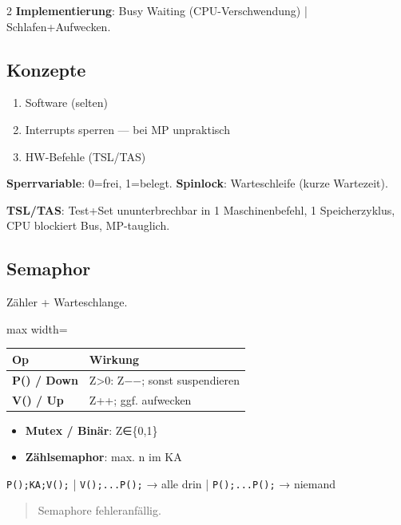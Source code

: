 \documentclass[10pt, a4paper]{article}
\begin{document}
\begin{multicols}{2}
\textbf{Implementierung}: Busy Waiting (CPU-Verschwendung) | Schlafen+Aufwecken.



\subsection{Konzepte}
\begin{enumerate}
  \item Software (selten)
  \item Interrupts sperren — bei MP unpraktisch
  \item HW-Befehle (TSL/TAS)
\end{enumerate}

\textbf{Sperrvariable}: 0=frei, 1=belegt. \textbf{Spinlock}: Warteschleife (kurze Wartezeit).


\textbf{TSL/TAS}: Test+Set ununterbrechbar in 1 Maschinenbefehl, 1 Speicherzyklus, CPU blockiert Bus, MP-tauglich.



\subsection{Semaphor}

Zähler + Warteschlange.



{\small
\begin{adjustbox}{max width=\linewidth}
{\scriptsize
\begin{tabular}{ll}
\toprule
\textbf{Op} & \textbf{Wirkung} \\
\midrule
\textbf{P() / Down} & Z>0: Z−−; sonst suspendieren \\
\textbf{V() / Up} & Z++; ggf. aufwecken \\
\bottomrule
\end{tabular}
}
\end{adjustbox}
}


\begin{itemize}
  \item \textbf{Mutex / Binär}: Z∈\{0,1\}
  \item \textbf{Zählsemaphor}: max. n im KA
\end{itemize}

\texttt{P();KA;V();} | \texttt{V();...P();} → alle drin | \texttt{P();...P();} → niemand


\begin{quote}
Semaphore fehleranfällig.
\end{quote}



\end{multicols}
\end{document}
